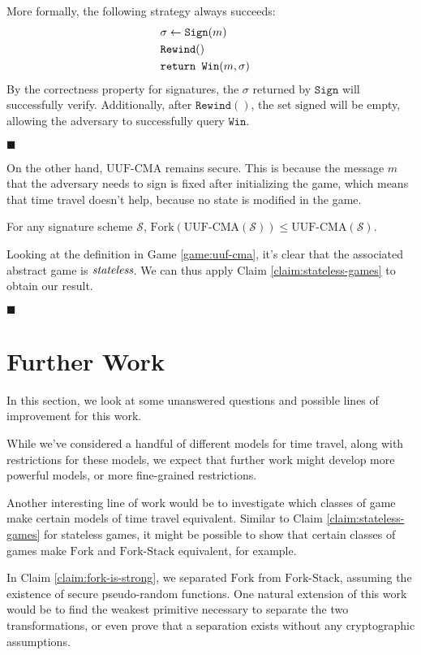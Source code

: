 More formally, the following strategy always succeeds:
$$
\begin{aligned}
&\sigma \gets \texttt{Sign}(m)\cr
&\texttt{Rewind}()\cr
&\texttt{return } \texttt{Win}(m, \sigma)\cr
\end{aligned}
$$
By the correctness property for signatures, the $\sigma$ returned
by $\texttt{Sign}$ will successfully verify.
Additionally, after $\texttt{Rewind}()$, the set $\text{signed}$
will be empty, allowing the adversary to successfully query $\texttt{Win}$.

$\blacksquare$

On the other hand, $\text{UUF-CMA}$ remains secure.
This is because the message $m$ that the adversary needs to sign
is fixed after initializing the game, which means that time travel
doesn't help, because no state is modified in the game.


\begin{claim}
\label{claim:uuf-cpa-secure}
For any signature scheme $\mathcal{S}$,
$\text{Fork}(\text{UUF-CMA}(\mathcal{S})) \leq \text{UUF-CMA}(\mathcal{S})$.
\end{claim}

Looking at the definition in Game \ref{game:uuf-cma}, it's clear
that the associated abstract game is $\emph{stateless}$.
We can thus apply Claim \ref{claim:stateless-games} to obtain our result.

$\blacksquare$

\section{Further Work}

In this section, we look at some unanswered questions and possible
lines of improvement for this work.

While we've considered a handful of different models for time travel,
along with restrictions for these models, we expect that further work
might develop more powerful models, or more fine-grained restrictions.

Another interesting line of work would be to investigate which classes
of game make certain models of time travel equivalent.
Similar to Claim \ref{claim:stateless-games} for stateless games,
it might be possible to show that certain classes of games make
$\text{Fork}$ and $\text{Fork-Stack}$ equivalent, for example.

In Claim \ref{claim:fork-is-strong}, we separated $\text{Fork}$
from $\text{Fork-Stack}$, assuming the existence of secure
pseudo-random functions.
One natural extension of this work would be to find the weakest
primitive necessary to separate the two transformations, or
even prove that a separation exists without any cryptographic assumptions.

